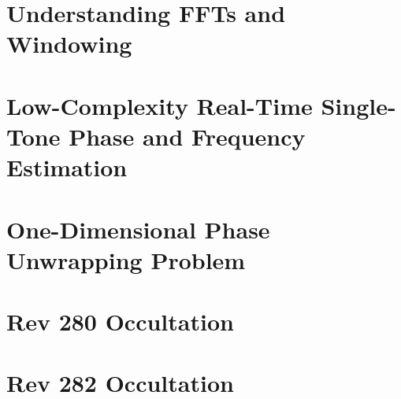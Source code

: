 \documentclass[crop=false,class=book,oneside]{standalone}
\begin{document}
    \section{Understanding FFTs and Windowing}
    \section{Low-Complexity Real-Time Single-Tone Phase
             and Frequency Estimation}
    \section{One-Dimensional Phase Unwrapping Problem}
    \section{Rev 280 Occultation}
    \section{Rev 282 Occultation}
\end{document}
